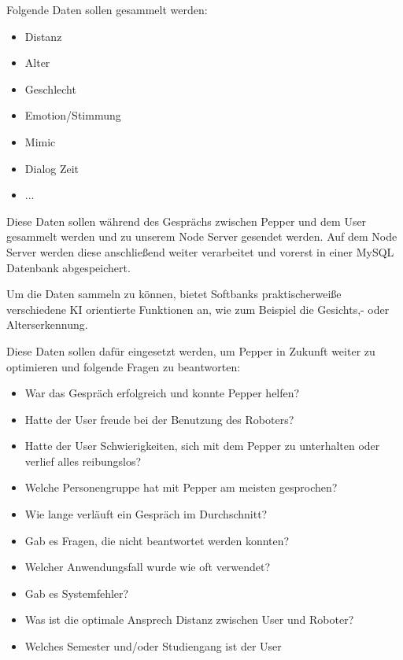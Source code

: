 Folgende Daten sollen gesammelt werden:
\begin{itemize}
    \item Distanz
    \item Alter
    \item Geschlecht
    \item Emotion/Stimmung
    \item Mimic
    \item Dialog Zeit
    \item ...
\end{itemize}

Diese Daten sollen während des Gesprächs zwischen Pepper und dem User gesammelt werden und zu unserem Node Server gesendet werden.
Auf dem Node Server werden diese anschließend weiter verarbeitet und vorerst in einer MySQL Datenbank abgespeichert.

Um die Daten sammeln zu können, bietet Softbanks praktischerweiße verschiedene KI orientierte Funktionen an, wie zum Beispiel die Gesichts,- oder Alterserkennung.

Diese Daten sollen dafür eingesetzt werden, um Pepper in Zukunft weiter zu optimieren und folgende Fragen zu beantworten:
\begin{itemize}
    \item War das Gespräch erfolgreich und konnte Pepper helfen?
    \item Hatte der User freude bei der Benutzung des Roboters?
    \item Hatte der User Schwierigkeiten, sich mit dem Pepper zu unterhalten oder verlief alles reibungslos?
    \item Welche Personengruppe hat mit Pepper am meisten gesprochen?
    \item Wie lange verläuft ein Gespräch im Durchschnitt?
    \item Gab es Fragen, die nicht beantwortet werden konnten?
    \item Welcher Anwendungsfall wurde wie oft verwendet?
    \item Gab es Systemfehler?
    \item Was ist die optimale Ansprech Distanz zwischen User und Roboter?
    \item Welches Semester und/oder Studiengang ist der User
\end{itemize}